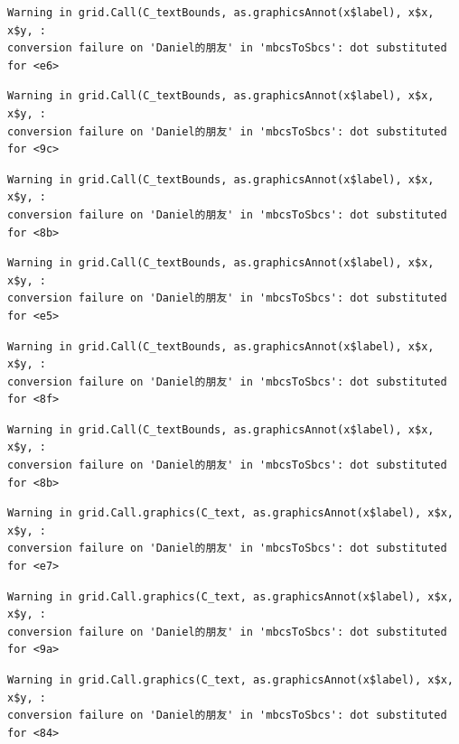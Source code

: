 \documentclass[
  letterpaper,
  DIV=11,
  numbers=noendperiod]{scrreprt}
\begin{document}
\begin{verbatim}
Warning in grid.Call(C_textBounds, as.graphicsAnnot(x$label), x$x, x$y, :
conversion failure on 'Daniel的朋友' in 'mbcsToSbcs': dot substituted for <e6>
\end{verbatim}

\begin{verbatim}
Warning in grid.Call(C_textBounds, as.graphicsAnnot(x$label), x$x, x$y, :
conversion failure on 'Daniel的朋友' in 'mbcsToSbcs': dot substituted for <9c>
\end{verbatim}

\begin{verbatim}
Warning in grid.Call(C_textBounds, as.graphicsAnnot(x$label), x$x, x$y, :
conversion failure on 'Daniel的朋友' in 'mbcsToSbcs': dot substituted for <8b>
\end{verbatim}

\begin{verbatim}
Warning in grid.Call(C_textBounds, as.graphicsAnnot(x$label), x$x, x$y, :
conversion failure on 'Daniel的朋友' in 'mbcsToSbcs': dot substituted for <e5>
\end{verbatim}

\begin{verbatim}
Warning in grid.Call(C_textBounds, as.graphicsAnnot(x$label), x$x, x$y, :
conversion failure on 'Daniel的朋友' in 'mbcsToSbcs': dot substituted for <8f>
\end{verbatim}

\begin{verbatim}
Warning in grid.Call(C_textBounds, as.graphicsAnnot(x$label), x$x, x$y, :
conversion failure on 'Daniel的朋友' in 'mbcsToSbcs': dot substituted for <8b>
\end{verbatim}

\begin{verbatim}
Warning in grid.Call.graphics(C_text, as.graphicsAnnot(x$label), x$x, x$y, :
conversion failure on 'Daniel的朋友' in 'mbcsToSbcs': dot substituted for <e7>
\end{verbatim}

\begin{verbatim}
Warning in grid.Call.graphics(C_text, as.graphicsAnnot(x$label), x$x, x$y, :
conversion failure on 'Daniel的朋友' in 'mbcsToSbcs': dot substituted for <9a>
\end{verbatim}

\begin{verbatim}
Warning in grid.Call.graphics(C_text, as.graphicsAnnot(x$label), x$x, x$y, :
conversion failure on 'Daniel的朋友' in 'mbcsToSbcs': dot substituted for <84>
\end{verbatim}
\end{document}
